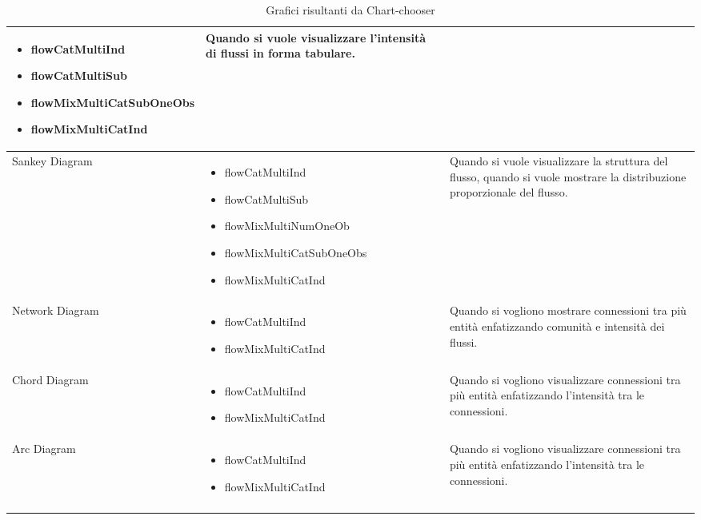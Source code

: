 \begin{xltabular}{\columnwidth}{|p{0.15\columnwidth}|X|p{0.27\columnwidth}|}
    \begin{itemize}[noitemsep,topsep=0pt, left=0pt]
        \item flowCatMultiInd
        \item flowCatMultiSub
        \item flowMixMultiCatSubOneObs
        \item flowMixMultiCatInd
    \end{itemize} & 
    Quando si vuole visualizzare l'intensità di flussi in forma tabulare. \\
    \hline
    Sankey Diagram & 
    \vspace{-3.5mm}
    \begin{itemize}[noitemsep,topsep=0pt, left=0pt]
        \item flowCatMultiInd
        \item flowCatMultiSub
        \item flowMixMultiNumOneOb
        \item flowMixMultiCatSubOneObs
        \item flowMixMultiCatInd
    \end{itemize} & 
    Quando si vuole visualizzare la struttura del flusso, quando si vuole mostrare la distribuzione proporzionale del flusso. \\
    \hline
    Network Diagram & 
    \vspace{-3.5mm}
    \begin{itemize}[noitemsep,topsep=0pt, left=0pt]
        \item flowCatMultiInd
        \item flowMixMultiCatInd
    \end{itemize} & 
    Quando si vogliono mostrare connessioni tra più entità enfatizzando comunità e intensità dei flussi. \\
    \hline
    Chord Diagram & 
    \vspace{-3.5mm}
    \begin{itemize}[noitemsep,topsep=0pt, left=0pt]
        \item flowCatMultiInd
        \item flowMixMultiCatInd
    \end{itemize} & 
    Quando si vogliono visualizzare connessioni tra più entità enfatizzando l'intensità tra le connessioni. \\
    \hline
    Arc Diagram & 
    \vspace{-3.5mm}
    \begin{itemize}[noitemsep,topsep=0pt, left=0pt]
        \item flowCatMultiInd
        \item flowMixMultiCatInd
    \end{itemize} & 
    Quando si vogliono visualizzare connessioni tra più entità enfatizzando l'intensità tra le connessioni. \\
    \hline
    \caption{Grafici risultanti da Chart-chooser}
    \label{tab:grafici}
\end{xltabular}